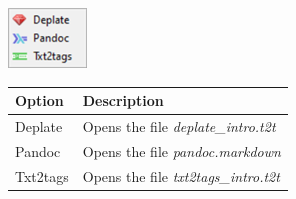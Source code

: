\includegraphics[scale=0.8]{./res/menu_help_conversion.png}\\

\begin{scriptsize}
  \begin{tabularx}{\textwidth}{>{\hsize=0.3\hsize}X>{\hsize=0.7\hsize}X}\\
    \hline
    \textbf{Option} & \textbf{Description} \\
    \hline
    Deplate & Opens the file \textit{deplate\_intro.t2t} \\
    Pandoc & Opens the file \textit{pandoc.markdown} \\
    Txt2tags & Opens the file \textit{txt2tags\_intro.t2t} \\
    \hline
  \end{tabularx}
\end{scriptsize}
